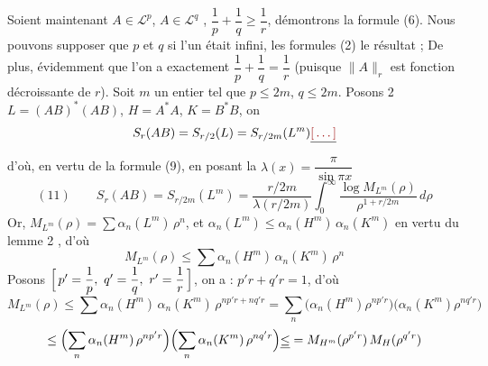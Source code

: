 \documentclass[11pt,a4paper]{article}
\begin{document}
Soient maintenant $A \in \mathcal{L}^p$, $A \in \mathcal{L}^q$ ,   $\dfrac1p + \dfrac1q \geq \dfrac1r$, démontrons la formule (6). Nous pouvons supposer que $p$ et $q$     si l'un était infini, les formules (2)    le résultat ; De plus,    évidemment   que l'on a exactement $\dfrac1p + \dfrac1q = \dfrac1r$ (puisque $\|A\|_r$ est fonction décroissante de $r$). Soit $m$ un entier tel que $p \leq 2m$, $q \leq 2m$.  Posons     2   $L = (AB)^*(AB)$, $H = A^*A$, $K = B^*B$, on 
\[
  S_r(AB) = S_{r/2}(L) = S_{r/2m}(L^m) \struck{\ill{}}
\]
d'où, en vertu de la formule (9), en posant  la  $\lambda(x) = \dfrac{\pi}{\sin \pi x}$
\[
  (11)\qquad S_r(AB) = S_{r/2m}(L^m) = \frac{r/2m}{\lambda(r/2m)} \int_0^\infty \frac{\log M_{L^m}(\rho)}{\rho^{1 + r/2m}}\, d\rho
\]
 Or,  $M_{L^m}(\rho) = \sum \alpha_n(L^m)\, \rho^n$, et  $\alpha_n(L^m) \leq \alpha_n(H^m)\, \alpha_n(K^m)$ en vertu du lemme 2 , d'où
\[
  M_{L^m}(\rho) \leq \sum \alpha_n(H^m)\, \alpha_n(K^m)\, \rho^n
\]
Posons $\Bigl[\, p' = \dfrac1p,\ q' = \dfrac1q,\ r' = \dfrac1r \,\Bigr]$, on a :  $p'r + q'r = 1$, d'où
\[
  M_{L^m}(\rho) \leq \sum \alpha_n(H^m)\, \alpha_n(K^m)\, \rho^{np'r + nq'r} = \sum_n \bigl(\alpha_n(H^m)\rho^{np'r}\bigr)\bigl(\alpha_n(K^m)\rho^{nq'r}\bigr)
\]
 
\[
  \leq \Bigl(\sum_n \alpha_n(H^m)\, \rho^{np'r}\Bigr)\Bigl(\sum_n \alpha_n(K^m)\, \rho^{nq'r}\Bigr) \struck{\leq} = M_{H^m}(\rho^{p'r})\, M_{H}(\rho^{q'r})
\]
\end{document}
